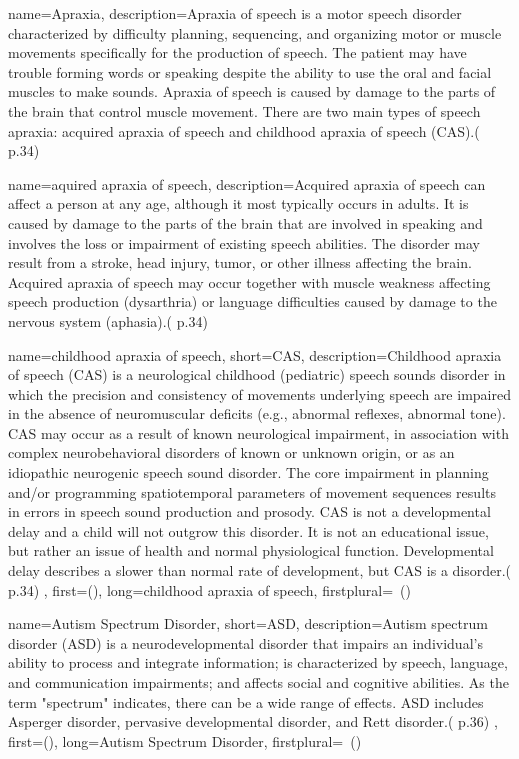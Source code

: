  {
	name={Apraxia}, 
	description={Apraxia of speech is a motor speech disorder characterized by difficulty planning, sequencing, and organizing motor or muscle movements specifically for the production of speech. The patient may have trouble forming words or speaking despite the ability to use the oral and facial muscles to make sounds. Apraxia of speech is caused by damage to the parts of the brain
that control muscle movement. There are two main types of speech apraxia: acquired apraxia of speech and childhood apraxia of speech (CAS).(\cite{SLPathologies} p.34)
}
}

 {
	name={aquired apraxia of speech}, 
	description={Acquired apraxia of speech can affect a person at any age, although it most typically occurs in adults. It is caused by damage to the parts of the brain that are involved in speaking and involves the loss or impairment of existing speech abilities. The disorder may result from a stroke, head injury, tumor, or other illness affecting the brain. Acquired apraxia of speech may
occur together with muscle weakness affecting speech production (dysarthria) or language difficulties caused by damage to the nervous system (aphasia).(\cite{SLPathologies} p.34)
}
}

 {
	name={childhood apraxia of speech}, 
	short={CAS},
	description={Childhood apraxia of speech (CAS) is a neurological childhood (pediatric) speech sounds disorder in which the precision and consistency of movements underlying speech are impaired in the absence of neuromuscular deficits (e.g., abnormal reflexes, abnormal tone). CAS may occur as a result of known neurological impairment, in association with complex neurobehavioral disorders of known or unknown origin, or as an idiopathic neurogenic speech
sound disorder. The core impairment in planning and/or programming spatiotemporal parameters of movement sequences results in errors in speech sound production and prosody. CAS is not a developmental delay and a child will not outgrow this disorder. It is not an educational issue, but rather an issue of health and normal physiological function. Developmental delay describes a slower than normal rate of development, but CAS is a disorder.(\cite{SLPathologies} p.34)
},
first={}(),
	long={childhood apraxia of speech},
	firstplural={\glspluralsuffix\ (\glspluralsuffix )}
}

 {
	name={Autism Spectrum Disorder}, 
	short={ASD},
	description={Autism spectrum disorder (ASD) is a neurodevelopmental disorder that impairs an individual’s ability to process and integrate information; is characterized by speech, language, and communication impairments; and affects social and cognitive abilities. As the term "spectrum" indicates, there can be a wide range of effects. ASD includes Asperger disorder, pervasive developmental disorder, and Rett disorder.(\cite{SLPathologies} p.36)
},
first={}(),
	long={Autism Spectrum Disorder},
	firstplural={\glspluralsuffix\ (\glspluralsuffix )}
}

